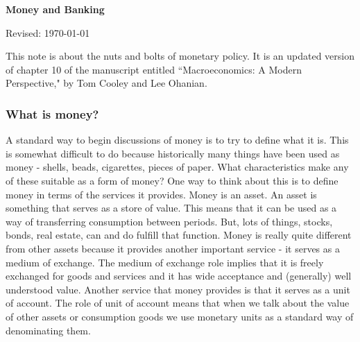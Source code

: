\documentclass[letterpaper,12pt]{article}
\def\HeadName{Money and Banking}
\begin{document}
\thispagestyle{empty}%
\Head

\centerline{\large \bf \HeadName}%
\centerline{Revised: \today}

\bigskip

This note is about the nuts and bolts of monetary policy. It is an
updated version of chapter 10 of the manuscript entitled
``Macroeconomics: A Modern Perspective," by Tom Cooley and Lee
Ohanian.

\subsubsection*{What is money?}

A standard way to begin discussions of money is to try to define
what it is. This is somewhat difficult to do because historically
many things have been used as money - shells, beads, cigarettes,
pieces of paper. What characteristics make any of these suitable as
a form of money? One way to think about this is to define money in
terms of the services it provides. Money is an asset. An asset is
something that serves as a store of value. This means that it can be
used as a way of transferring consumption between periods. But, lots
of things, stocks, bonds, real estate, can and do fulfill that
function. Money is really quite different from other assets because
it provides another important service - it serves as a medium of
exchange. The medium of exchange role implies that it is freely
exchanged for goods and services and it has wide acceptance and
(generally) well understood value. Another service that money
provides is that it serves as a unit of account. The role of unit of
account means that when we talk about the value of other assets or
consumption goods we use monetary units as a standard way of
denominating them.
\end{document}
